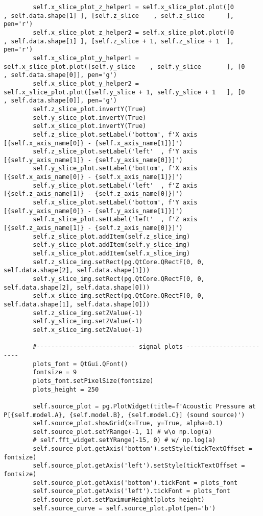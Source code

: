 \documentclass[../main.tex]{subfiles}
\begin{document}
\begin{lstlisting}
        self.x_slice_plot_z_helper1 = self.x_slice_plot.plot([0               , self.data.shape[1] ], [self.z_slice    , self.z_slice      ], pen='r')
        self.x_slice_plot_z_helper2 = self.x_slice_plot.plot([0               , self.data.shape[1] ], [self.z_slice + 1, self.z_slice + 1  ], pen='r')
        self.x_slice_plot_y_helper1 = self.x_slice_plot.plot([self.y_slice    , self.y_slice       ], [0               , self.data.shape[0]], pen='g')
        self.x_slice_plot_y_helper2 = self.x_slice_plot.plot([self.y_slice + 1, self.y_slice + 1   ], [0               , self.data.shape[0]], pen='g')
        self.z_slice_plot.invertY(True)
        self.y_slice_plot.invertY(True)
        self.x_slice_plot.invertY(True)
        self.z_slice_plot.setLabel('bottom', f'X axis [{self.x_axis_name[0]} - {self.x_axis_name[1]}]')
        self.z_slice_plot.setLabel('left'  , f'Y axis [{self.y_axis_name[1]} - {self.y_axis_name[0]}]')
        self.y_slice_plot.setLabel('bottom', f'X axis [{self.x_axis_name[0]} - {self.x_axis_name[1]}]')
        self.y_slice_plot.setLabel('left'  , f'Z axis [{self.z_axis_name[1]} - {self.z_axis_name[0]}]')
        self.x_slice_plot.setLabel('bottom', f'Y axis [{self.y_axis_name[0]} - {self.y_axis_name[1]}]')
        self.x_slice_plot.setLabel('left'  , f'Z axis [{self.z_axis_name[1]} - {self.z_axis_name[0]}]')
        self.z_slice_plot.addItem(self.z_slice_img)
        self.y_slice_plot.addItem(self.y_slice_img)
        self.x_slice_plot.addItem(self.x_slice_img)
        self.z_slice_img.setRect(pg.QtCore.QRectF(0, 0, self.data.shape[2], self.data.shape[1]))
        self.y_slice_img.setRect(pg.QtCore.QRectF(0, 0, self.data.shape[2], self.data.shape[0]))
        self.x_slice_img.setRect(pg.QtCore.QRectF(0, 0, self.data.shape[1], self.data.shape[0]))
        self.z_slice_img.setZValue(-1)
        self.y_slice_img.setZValue(-1)
        self.x_slice_img.setZValue(-1)

        #--------------------------- signal plots ------------------------
        plots_font = QtGui.QFont()
        fontsize = 9
        plots_font.setPixelSize(fontsize)
        plots_height = 250

        self.source_plot = pg.PlotWidget(title=f'Acoustic Pressure at P[{self.model.A}, {self.model.B}, {self.model.C}] (sound source)')
        self.source_plot.showGrid(x=True, y=True, alpha=0.1)
        self.source_plot.setYRange(-1, 1) # w\o np.log(a)
        # self.fft_widget.setYRange(-15, 0) # w/ np.log(a)
        self.source_plot.getAxis('bottom').setStyle(tickTextOffset = fontsize)
        self.source_plot.getAxis('left').setStyle(tickTextOffset = fontsize)
        self.source_plot.getAxis('bottom').tickFont = plots_font
        self.source_plot.getAxis('left').tickFont = plots_font
        self.source_plot.setMaximumHeight(plots_height)
        self.source_curve = self.source_plot.plot(pen='b')



\end{lstlisting}
\end{document}

